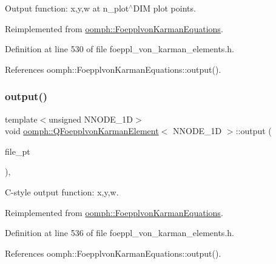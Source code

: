 Output function\+: x,y,w at n\+\_\+plot$^\wedge$\+D\+IM plot points. 



Reimplemented from \hyperlink{classoomph_1_1FoepplvonKarmanEquations_aa97cf4d70c7c059e6cb38557282156a5}{oomph\+::\+Foepplvon\+Karman\+Equations}.



Definition at line 530 of file foeppl\+\_\+von\+\_\+karman\+\_\+elements.\+h.



References oomph\+::\+Foepplvon\+Karman\+Equations\+::output().

\mbox{\label{classoomph_1_1QFoepplvonKarmanElement_a8ac6c9196e21b2848e1519f572a0e24e}} 
\subsubsection{\texorpdfstring{output()}{output()}\hspace{0.1cm}{\footnotesize\ttfamily [3/4]}}
{\footnotesize\ttfamily template$<$unsigned N\+N\+O\+D\+E\+\_\+1D$>$ \\
void \hyperlink{classoomph_1_1QFoepplvonKarmanElement}{oomph\+::\+Q\+Foepplvon\+Karman\+Element}$<$ N\+N\+O\+D\+E\+\_\+1D $>$\+::output (\begin{DoxyParamCaption}\item[{F\+I\+LE $\ast$}]{file\+\_\+pt }\end{DoxyParamCaption})\hspace{0.3cm}{\ttfamily [inline]}, {\ttfamily [virtual]}}



C-\/style output function\+: x,y,w. 



Reimplemented from \hyperlink{classoomph_1_1FoepplvonKarmanEquations_a19d1540525a0c822c059ce50989710a6}{oomph\+::\+Foepplvon\+Karman\+Equations}.



Definition at line 536 of file foeppl\+\_\+von\+\_\+karman\+\_\+elements.\+h.



References oomph\+::\+Foepplvon\+Karman\+Equations\+::output().

\mbox{\label{classoomph_1_1QFoepplvonKarmanElement_a06a3e1ea84c4177bc32c819b5aa0f01e}} 
